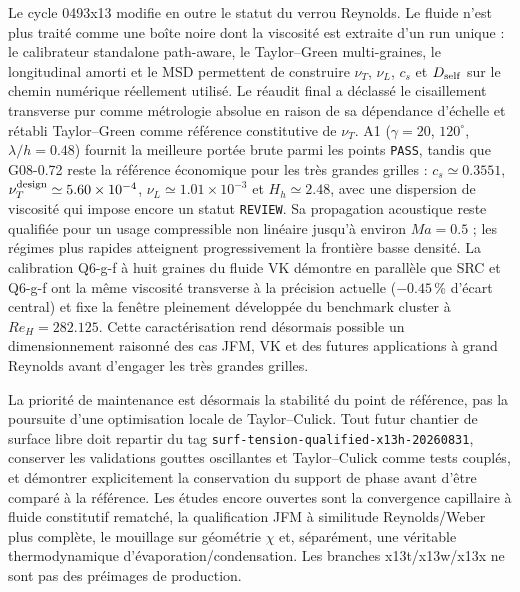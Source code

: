 \documentclass[11pt,a4paper]{article}
\begin{document}
Le cycle 0493x13 modifie en outre le statut du verrou Reynolds. Le fluide n'est plus traité comme une boîte noire dont la viscosité est extraite d'un run unique : le calibrateur standalone path-aware, le Taylor--Green multi-graines, le longitudinal amorti et le MSD permettent de construire $\nu_T$, $\nu_L$, $c_s$ et $D_{\rm self}$ sur le chemin numérique réellement utilisé. Le réaudit final a déclassé le cisaillement transverse pur comme métrologie absolue en raison de sa dépendance d'échelle et rétabli Taylor--Green comme référence constitutive de $\nu_T$. A1 ($\gamma=20$, $120^\circ$, $\lambda/h=0.48$) fournit la meilleure portée brute parmi les points \texttt{PASS}, tandis que G08-0.72 reste la référence économique pour les très grandes grilles : $c_s\simeq0.3551$, $\nu_T^{\rm design}\simeq5.60\times10^{-4}$, $\nu_L\simeq1.01\times10^{-3}$ et $H_h\simeq2.48$, avec une dispersion de viscosité qui impose encore un statut \texttt{REVIEW}. Sa propagation acoustique reste qualifiée pour un usage compressible non linéaire jusqu'à environ $Ma=0.5$ ; les régimes plus rapides atteignent progressivement la frontière basse densité. La calibration Q6-g-f à huit graines du fluide VK démontre en parallèle que SRC et Q6-g-f ont la même viscosité transverse à la précision actuelle ($-0.45\,\%$ d'écart central) et fixe la fenêtre pleinement développée du benchmark cluster à $Re_H=282.125$. Cette caractérisation rend désormais possible un dimensionnement raisonné des cas JFM, VK et des futures applications à grand Reynolds avant d'engager les très grandes grilles.

La priorité de maintenance est désormais la stabilité du point de référence, pas la poursuite d'une optimisation locale de Taylor--Culick. Tout futur chantier de surface libre doit repartir du tag \texttt{surf-tension-qualified-x13h-20260831}, conserver les validations gouttes oscillantes et Taylor--Culick comme tests couplés, et démontrer explicitement la conservation du support de phase avant d'être comparé à la référence. Les études encore ouvertes sont la convergence capillaire à fluide constitutif rematché, la qualification JFM à similitude Reynolds/Weber plus complète, le mouillage sur géométrie $\chi$ et, séparément, une véritable thermodynamique d'évaporation/condensation. Les branches x13t/x13w/x13x ne sont pas des préimages de production.
\end{document}
